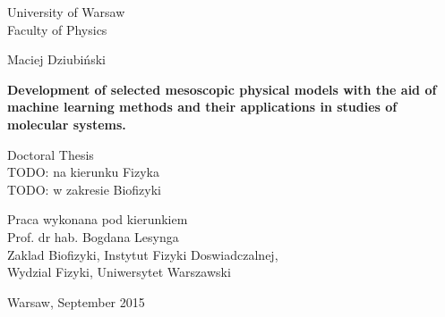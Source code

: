 \vspace{1cm}		%
\pagestyle{empty}	%

\begin{center}
\begin{huge}
	\textsf{University of Warsaw}\\
	\vspace{0.4cm}		%
	\textsf{Faculty of Physics}
\end{huge}

\vspace{2cm}		%

\begin{Large}
	Maciej Dziubiński\\
\end{Large}

\vspace{1.5cm}

\begin{huge}
	\textbf{\textsf{Development of selected mesoscopic physical models with the aid of machine learning methods and their applications in studies of molecular systems.}}
\end{huge}

\vspace{3cm}

\begin{large}
	Doctoral Thesis\\
	TODO: na kierunku Fizyka\\
	TODO: w zakresie Biofizyki\\
\end{large}

\end{center}

\vspace{2cm}		%

\begin{flushright}
\begin{large}
	Praca wykonana pod kierunkiem\\
	Prof. dr hab. Bogdana Lesynga\\
	Zaklad Biofizyki, Instytut Fizyki Doswiadczalnej,\\
	Wydzial Fizyki, Uniwersytet Warszawski\\
\end{large}
\end{flushright}

\vspace{2.0cm}

\begin{center}
	Warsaw, September 2015
\end{center}


